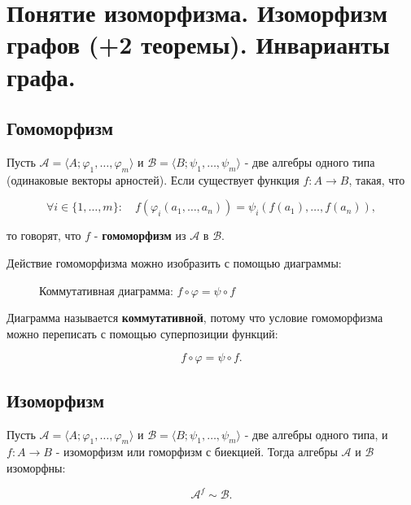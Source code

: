 {
	\section{Понятие изоморфизма. Изоморфизм графов (+2 теоремы). Инварианты графа.}

	\subsection*{Гомоморфизм}

Пусть $\mathcal{A} = \langle A; \varphi_1, \dots, \varphi_m \rangle$ и $\mathcal{B} = \langle B; \psi_1, \dots, \psi_m \rangle$ - две алгебры одного типа (одинаковые векторы арностей). Если существует функция $f : A \to B$, такая, что


\[
\forall i \in \{1, \dots, m\}:\quad f(\varphi_i(a_1, \dots, a_n)) = \psi_i(f(a_1), \dots, f(a_n)),
\]


то говорят, что $f$ - \textbf{гомоморфизм} из $\mathcal{A}$ в $\mathcal{B}$.

Действие гомоморфизма можно изобразить с помощью диаграммы:



\begin{figure}[h]
\centering
{}
\caption{Коммутативная диаграмма: $f \circ \varphi = \psi \circ f$}
\end{figure}




Диаграмма называется \textbf{коммутативной}, потому что условие гомоморфизма можно переписать с помощью суперпозиции функций:


\[
f \circ \varphi = \psi \circ f.
\]

\subsection*{Изоморфизм}

Пусть $\mathcal{A} = \langle A; \varphi_1, \dots, \varphi_m \rangle$ и $\mathcal{B} = \langle B; \psi_1, \dots, \psi_m \rangle$ - две алгебры одного типа, и $f : A \to B$ - изоморфизм или гоморфизм с биекцией. Тогда алгебры $\mathcal{A}$ и $\mathcal{B}$ изоморфны:


\[
\mathcal{A}^f \sim \mathcal{B}.
\]



}
